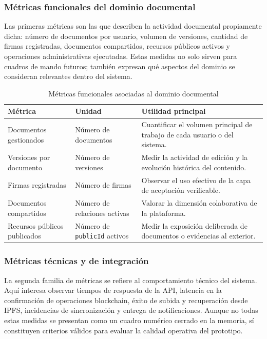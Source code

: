 \documentclass[11pt, a4paper]{article}
\begin{document}
\subsubsection{Métricas funcionales del dominio documental}

Las primeras métricas son las que describen la actividad documental propiamente dicha: número de documentos por usuario, volumen de versiones, cantidad de firmas registradas, documentos compartidos, recursos públicos activos y operaciones administrativas ejecutadas. Estas medidas no solo sirven para cuadros de mando futuros; también expresan qué aspectos del dominio se consideran relevantes dentro del sistema.

\begin{table}[H]
    \centering
    \small
    \begin{tabular}{|p{4cm}|p{3.5cm}|p{5.9cm}|}
    \hline
    \textbf{Métrica} & \textbf{Unidad} & \textbf{Utilidad principal} \\
    \hline
    Documentos gestionados & Número de documentos & Cuantificar el volumen principal de trabajo de cada usuario o del sistema. \\
    \hline
    Versiones por documento & Número de versiones & Medir la actividad de edición y la evolución histórica del contenido. \\
    \hline
    Firmas registradas & Número de firmas & Observar el uso efectivo de la capa de aceptación verificable. \\
    \hline
    Documentos compartidos & Número de relaciones activas & Valorar la dimensión colaborativa de la plataforma. \\
    \hline
    Recursos públicos publicados & Número de \texttt{publicId} activos & Medir la exposición deliberada de documentos o evidencias al exterior. \\
    \hline
    \end{tabular}
    \caption{Métricas funcionales asociadas al dominio documental}
    \label{tab:metricas-funcionales-documentales}
\end{table}

\subsubsection{Métricas técnicas y de integración}

La segunda familia de métricas se refiere al comportamiento técnico del sistema. Aquí interesa observar tiempos de respuesta de la API, latencia en la confirmación de operaciones blockchain, éxito de subida y recuperación desde IPFS, incidencias de sincronización y entrega de notificaciones. Aunque no todas estas medidas se presentan como un cuadro numérico cerrado en la memoria, sí constituyen criterios válidos para evaluar la calidad operativa del prototipo.
\end{document}
